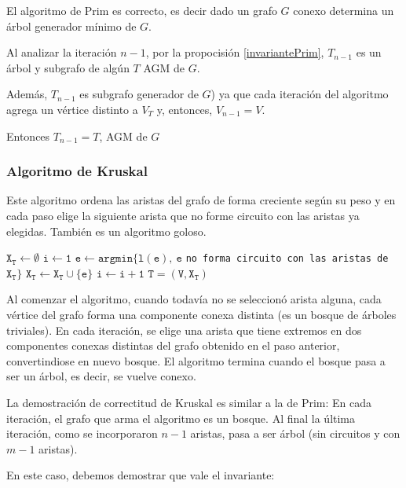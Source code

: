 \begin{theorem}
	El algoritmo de Prim es correcto, es decir dado un grafo \(G\) conexo determina un árbol generador mínimo de \(G\).
\end{theorem}
\begin{demo}
	Al analizar la iteración \(n-1\), por la propocisión \ref{invariantePrim}, \(T_{n-1}\) es un árbol y subgrafo de algún \(T\) AGM de \(G\).

	Además, \(T_{n-1}\) es subgrafo generador de \(G\)) ya que cada iteración del algoritmo agrega un vértice distinto a \(V_T\) y, entonces, \(V_{n-1} = V\).

	Entonces \(T_{n-1} = T\), AGM de \(G\)
\end{demo}

\subsubsection{Algoritmo de Kruskal}
Este algoritmo ordena las aristas del grafo de forma creciente según su peso y en cada paso elige la siguiente arista que no forme circuito con las aristas ya elegidas. También es un algoritmo goloso.

\begin{algorithmic}
	\State $\mathtt{X_T \gets \emptyset}$
	\State $\mathtt{i \gets 1}$
	\State $\mathtt{e \gets argmin\{l(e),~e}$ \texttt{no forma circuito con las aristas de }$\mathtt{X_T\}}$
	\State $\mathtt{X_T \gets X_T \cup \{e\}}$
	\State $\mathtt{i\gets i + 1}$
	\EndWhile
	\State \Return $\mathtt{T = (V, X_T)}$
	\EndProcedure
\end{algorithmic}

Al comenzar el algoritmo, cuando todavía no se seleccionó arista alguna, cada vértice del grafo forma una componente conexa distinta (es un bosque de árboles triviales). En cada iteración, se elige una arista que tiene extremos en dos componentes conexas distintas del grafo obtenido en el paso anterior, convertindiose en nuevo bosque. El algoritmo termina cuando el bosque pasa a ser un árbol, es decir, se vuelve conexo.

La demostración de correctitud de Kruskal es similar a la de Prim: En cada iteración, el grafo que arma el algoritmo es un bosque. Al final la última iteración, como se incorporaron \(n-1\) aristas, pasa a ser árbol (sin circuitos y con \(m-1\) aristas).

En este caso, debemos demostrar que vale el invariante:

